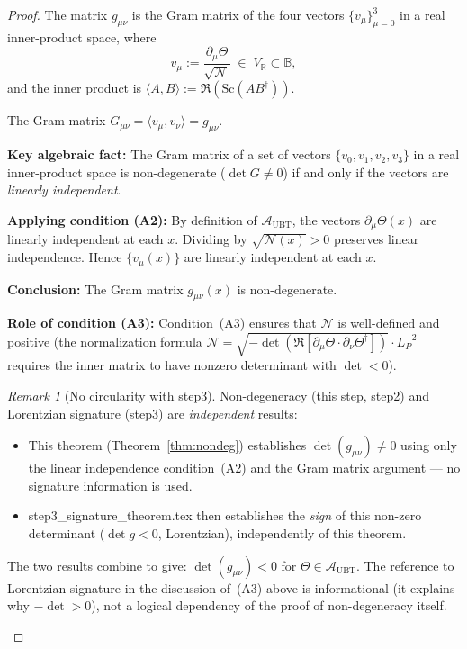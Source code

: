 \documentclass[12pt]{article}
\theoremstyle{definition}
\theoremstyle{remark}
\newtheorem{remark}[theorem]{Remark}
\begin{document}
\begin{proof}
The matrix $g_{\mu\nu}$ is the Gram matrix of the four vectors
$\{v_\mu\}_{\mu=0}^3$ in a real inner-product space, where
\begin{equation}
  v_\mu := \frac{\partial_\mu\Theta}{\sqrt{\mathcal{N}}} \;\in\; V_{\mathbb{R}} \subset \mathbb{B},
  \label{eq:gram_vectors}
\end{equation}
and the inner product is $\langle A, B\rangle := \Re(\mathrm{Sc}(AB^\dagger))$.

The Gram matrix $G_{\mu\nu} = \langle v_\mu, v_\nu\rangle = g_{\mu\nu}$.

\medskip
\textbf{Key algebraic fact:} The Gram matrix of a set of vectors
$\{v_0, v_1, v_2, v_3\}$ in a real inner-product space is non-degenerate
($\det G \neq 0$) if and only if the vectors are \emph{linearly independent}.

\medskip
\textbf{Applying condition (A2):} By definition of $\mathcal{A}_{\mathrm{UBT}}$,
the vectors $\partial_\mu\Theta(x)$ are linearly independent at each $x$.
Dividing by $\sqrt{\mathcal{N}(x)}>0$ preserves linear independence.
Hence $\{v_\mu(x)\}$ are linearly independent at each $x$.

\medskip
\textbf{Conclusion:} The Gram matrix $g_{\mu\nu}(x)$ is non-degenerate.

\medskip
\textbf{Role of condition (A3):} Condition~(A3) ensures that $\mathcal{N}$
is well-defined and positive (the normalization formula
$\mathcal{N} = \sqrt{-\det(\Re[\partial_\mu\Theta\cdot\partial_\nu\Theta^\dagger])}\cdot L_P^{-2}$
requires the inner matrix to have nonzero determinant with $\det < 0$).

\begin{remark}[No circularity with step3]
Non-degeneracy (this step, step2) and Lorentzian signature (step3) are
\emph{independent} results:
\begin{itemize}
  \item This theorem (Theorem~\ref{thm:nondeg}) establishes $\det(g_{\mu\nu})\neq 0$
        using only the linear independence condition~(A2) and the Gram matrix argument —
        no signature information is used.
  \item step3\_signature\_theorem.tex then establishes the \emph{sign} of this
        non-zero determinant ($\det g < 0$, Lorentzian), independently of this theorem.
\end{itemize}
The two results combine to give: $\det(g_{\mu\nu}) < 0$ for $\Theta\in\mathcal{A}_{\mathrm{UBT}}$.
The reference to Lorentzian signature in the discussion of~(A3) above is informational
(it explains why $-\det > 0$), not a logical dependency of the proof of non-degeneracy
itself.
\end{remark}
\end{proof}
\end{document}
